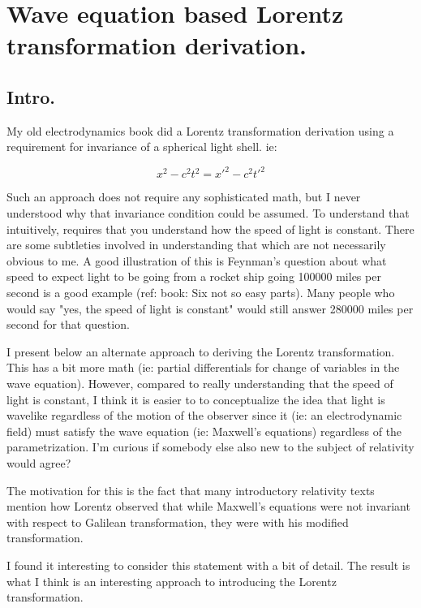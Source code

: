 \chapter{Wave equation based Lorentz transformation derivation.}
\label{chap:lorentz}
\date{ June 25, 2008.  $RCSfile: lorentz.tex,v $ Last $Revision: 1.13 $ $Date: 2009/07/04 18:48:21 $ }

\section{Intro.}

My old electrodynamics book did a Lorentz transformation derivation using a requirement for invariance of a spherical light shell.  ie:

\[
x^2 - c^2 t^2 = {x'}^2 - c^2 {t'}^2
\]

Such an approach does not require any sophisticated math, but I never understood why that invariance condition could be assumed.
To understand that intuitively, requires that you understand how the speed of light is constant.  There are some subtleties 
involved in understanding that which are not necessarily obvious to me.  A good illustration of this is Feynman's question
about what speed to expect light to be
going from a rocket ship going 100000 miles per second is a good example (ref: book: Six not so easy parts).
Many people who would say "yes, the speed of light is constant" would still answer 280000 miles per second for that question.

I present below an alternate approach to deriving the Lorentz transformation.  This has a bit more math (ie: partial differentials for 
change of variables in the wave equation).  However, compared to really understanding that the speed of light is constant,
I think it is easier to
to conceptualize the idea that light is wavelike regardless of the motion of the observer since it (ie: an electrodynamic field)
must satisfy the wave equation (ie: Maxwell's equations) regardless of the parametrization.  I'm curious if somebody
else also new to the subject of relativity would agree?

The motivation for this is the fact that many introductory relativity texts mention how Lorentz observed that
while Maxwell's equations were not invariant with respect to Galilean
transformation, they were with his modified transformation.

I found it interesting to consider this statement with a bit of detail.  The result is what I think is an interesting approach
to introducing the Lorentz transformation.

